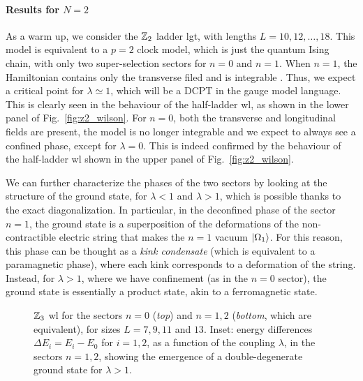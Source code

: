 \paragraph{Results for \texorpdfstring{$N=2$}{N=2}}
As a warm up, we consider the $\mathbb{Z}_2$ ladder \ac{lgt}, with lengths $L=10,12,\dots,18$.
This model is equivalent to a $p=2$ clock model, which is just the quantum Ising chain, with only two super-selection sectors for $n=0$ and $n=1$.
When $n=1$, the Hamiltonian  contains only the transverse filed and is integrable \cite{baxter1982exactlysm}.
Thus, we expect a critical point for $\lambda \simeq 1$, which will be a DCPT in the gauge model language.
This is clearly seen in the behaviour of the half-ladder \ac{wl}, as shown in the lower panel of Fig.~\ref{fig:z2_wilson}.
For $n=0$, both the transverse and longitudinal fields  are present, the model is no longer integrable  \cite{banuls2011thermalization, kormos2017confinement, pomponio2022bloch} and we expect to always see a confined phase, except for $\lambda = 0$.
This is indeed confirmed by the behaviour of the half-ladder \ac{wl} shown in the upper panel of Fig.~\ref{fig:z2_wilson}.

We can further characterize the phases of the two sectors by looking at the structure of the ground state, for $\lambda<1$ and $\lambda>1$, which is possible thanks to the exact diagonalization.
In particular, in the deconfined phase of the sector $n=1$, the ground state is a superposition of the deformations of the non-contractible electric string that makes the $n=1$ vacuum $\ket{\Omega_1}$.
For this reason, this phase can be thought as a \emph{kink condensate} \cite{fradkin1978order} (which is equivalent to a paramagnetic phase), where each kink corresponds to a deformation of the string.
Instead, for $\lambda > 1$, where we have confinement (as in the $n=0$ sector), the ground state is essentially a product state, akin to a ferromagnetic state. %


\begin{figure}[t]
    \centering
    
    \vspace*{-10pt}
    \caption[\ac{wl}s for the $\Z_3$ ladder \ac{lgt}]{$\Z_3$ \ac{wl} for the sectors $n=0$ (\emph{top}) and $n=1,2$ (\emph{bottom}, which are equivalent), for sizes $L = 7,9,11$ and $13$.
       Inset: energy differences $\Delta E_i = E_i - E_0$ for $i=1,2$, as a function of the coupling $\lambda$, in the sectors $n=1,2$, showing the emergence of a double-degenerate ground state for $\lambda > 1$.
}
    \label{fig:z3_wilson}
\end{figure}


